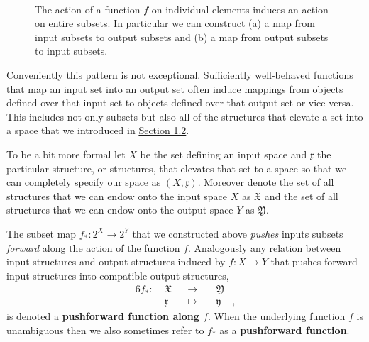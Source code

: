 \documentclass[
  letterpaper,
  DIV=11,
  numbers=noendperiod]{scrartcl}
\begin{document}
\begin{figure}
\begin{minipage}[t]{0.90\linewidth}
{{}

}

\subcaption{\label{fig-set-pullback}}
\end{minipage}%
%
\begin{minipage}[t]{0.05\linewidth}

{\centering 

~

}

\end{minipage}%

\caption{\label{fig-set-maps}The action of a function \(f\) on
individual elements induces an action on entire subsets. In particular
we can construct (a) a map from input subsets to output subsets and (b)
a map from output subsets to input subsets.}

\end{figure}

Conveniently this pattern is not exceptional. Sufficiently well-behaved
functions that map an input set into an output set often induce mappings
from objects defined over that input set to objects defined over that
output set or vice versa. This includes not only subsets but also all of
the structures that elevate a set into a space that we introduced in
\href{@sec:structures}{Section 1.2}.

To be a bit more formal let \(X\) be the set defining an input space and
\(\mathfrak{x}\) the particular structure, or structures, that elevates
that set to a space so that we can completely specify our space as
\((X, \mathfrak{x})\). Moreover denote the set of all structures that we
can endow onto the input space \(X\) as \(\mathfrak{X}\) and the set of
all structures that we can endow onto the output space \(Y\) as
\(\mathfrak{Y}\).

The subset map \(f_{*} : 2^X \rightarrow 2^Y\) that we constructed above
\emph{pushes} inputs subsets \emph{forward} along the action of the
function \(f\). Analogously any relation between input structures and
output structures induced by \(f : X \rightarrow Y\) that pushes forward
input structures into compatible output structures, \begin{alignat*}{6}
f_{*} :\; & \mathfrak{X} & &\rightarrow& \; & \mathfrak{Y} &
\\
& \mathfrak{x} & &\mapsto& & \mathfrak{y} &,
\end{alignat*} is denoted a \textbf{pushforward function along \(f\)}.
When the underlying function \(f\) is unambiguous then we also sometimes
refer to \(f_{*}\) as a \textbf{pushforward function}.
\end{document}
